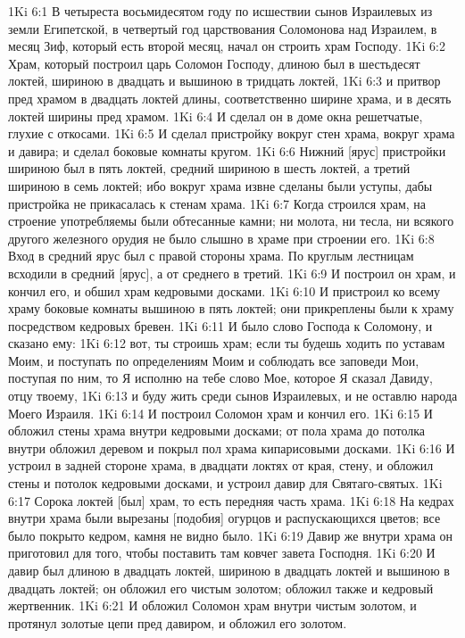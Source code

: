 1Ki 6:1  В четыреста восьмидесятом году по исшествии сынов Израилевых из земли Египетской, в четвертый год царствования Соломонова над Израилем, в месяц Зиф, который есть второй месяц, начал он строить храм Господу.
1Ki 6:2  Храм, который построил царь Соломон Господу, длиною был в шестьдесят локтей, шириною в двадцать и вышиною в тридцать локтей,
1Ki 6:3  и притвор пред храмом в двадцать локтей длины, соответственно ширине храма, и в десять локтей ширины пред храмом.
1Ki 6:4  И сделал он в доме окна решетчатые, глухие с откосами.
1Ki 6:5  И сделал пристройку вокруг стен храма, вокруг храма и давира; и сделал боковые комнаты кругом.
1Ki 6:6  Нижний [ярус] пристройки шириною был в пять локтей, средний шириною в шесть локтей, а третий шириною в семь локтей; ибо вокруг храма извне сделаны были уступы, дабы пристройка не прикасалась к стенам храма.
1Ki 6:7  Когда строился храм, на строение употребляемы были обтесанные камни; ни молота, ни тесла, ни всякого другого железного орудия не было слышно в храме при строении его.
1Ki 6:8  Вход в средний ярус был с правой стороны храма. По круглым лестницам всходили в средний [ярус], а от среднего в третий.
1Ki 6:9  И построил он храм, и кончил его, и обшил храм кедровыми досками.
1Ki 6:10  И пристроил ко всему храму боковые комнаты вышиною в пять локтей; они прикреплены были к храму посредством кедровых бревен.
1Ki 6:11  И было слово Господа к Соломону, и сказано ему:
1Ki 6:12  вот, ты строишь храм; если ты будешь ходить по уставам Моим, и поступать по определениям Моим и соблюдать все заповеди Мои, поступая по ним, то Я исполню на тебе слово Мое, которое Я сказал Давиду, отцу твоему,
1Ki 6:13  и буду жить среди сынов Израилевых, и не оставлю народа Моего Израиля.
1Ki 6:14  И построил Соломон храм и кончил его.
1Ki 6:15  И обложил стены храма внутри кедровыми досками; от пола храма до потолка внутри обложил деревом и покрыл пол храма кипарисовыми досками.
1Ki 6:16  И устроил в задней стороне храма, в двадцати локтях от края, стену, и обложил стены и потолок кедровыми досками, и устроил давир для Святаго-святых.
1Ki 6:17  Сорока локтей [был] храм, то есть передняя часть храма.
1Ki 6:18  На кедрах внутри храма были вырезаны [подобия] огурцов и распускающихся цветов; все было покрыто кедром, камня не видно было.
1Ki 6:19  Давир же внутри храма он приготовил для того, чтобы поставить там ковчег завета Господня.
1Ki 6:20  И давир был длиною в двадцать локтей, шириною в двадцать локтей и вышиною в двадцать локтей; он обложил его чистым золотом; обложил также и кедровый жертвенник.
1Ki 6:21  И обложил Соломон храм внутри чистым золотом, и протянул золотые цепи пред давиром, и обложил его золотом.
